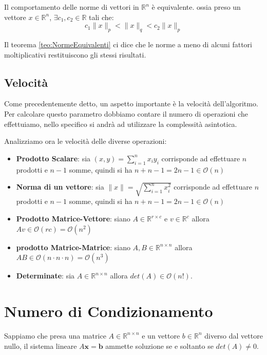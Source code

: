 \begin{teorema}\label{teo:NormeEquivalenti}
    Il comportamento delle norme di vettori in $\mathbb{R}^n$ è equivalente. ossia
    preso un vettore $x\in \mathbb{R}^n$, $\exists c_1,c_2\in \mathbb{R}$ tali che:
    \begin{equation}
        c_1\|x\|_p < \|x\|_q < c_2\|x\|_p
    \end{equation}
\end{teorema}
Il teorema \ref{teo:NormeEquivalenti} ci dice che le norme a meno di alcuni
fattori moltiplicativi restituiscono gli stessi risultati.
\subsection{Velocità}
Come precedentemente detto, un aspetto importante è la velocità dell'algoritmo.
Per calcolare questo parametro dobbiamo contare il numero di operazioni che
effettuiamo, nello specifico si andrà ad utilizzare la complessità asintotica.

Analizziamo ora le velocità delle diverse operazioni:
\begin{itemize}
    \item \textbf{Prodotto Scalare}: sia $(x,y) = \sum_{i=1}^n x_iy_i$ corrisponde
          ad effettuare $n$ prodotti e $n-1$ somme, quindi si ha $n + n - 1 = 2
              n -1 \in \mathcal{O}(n)$
    \item \textbf{Norma di un vettore}: sia $\|x\| = \sqrt{\sum_{i=1}^n x_i^2}$
          corrisponde ad effettuare $n$ prodotti e $n-1$ somme, quindi si ha
          $n + n - 1 = 2n -1 \in \mathcal{O}(n)$
    \item \textbf{Prodotto Matrice-Vettore}: siano $A\in \mathbb{R}^{r\times c}$
          e $v\in \mathbb{R}^c$ allora $Av\in \mathcal{O} (rc) = \mathcal{O}(n^2)$
    \item \textbf{prodotto Matrice-Matrice}: siano $A,B\in \mathbb{R}^{n\times n}$
          allora $AB\in \mathcal{O} (n \cdot n \cdot n) = \mathcal{O} (n^3)$
    \item \textbf{Determinate}: sia $A\in \mathbb{R}^{n\times n}$ allora
          $det(A) \in \mathcal{O}(n!)$.
\end{itemize}
\section{Numero di Condizionamento}
Sappiamo che presa una matrice $A \in \mathbb{R}^{n \times n}$ e un vettore $b
    \in \mathbb{R}^n$ diverso dal vettore nullo, il sistema lineare $A \textbf{x} =
    \textbf{b}$ ammette soluzione se e soltanto se $det(A) \neq 0$.

